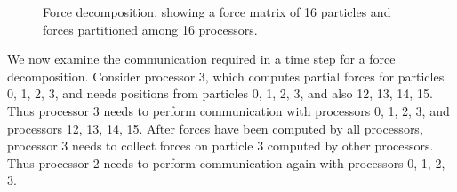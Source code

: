 \begin{figure}[htbp]
\begin{center}
\caption{Force decomposition, showing a force matrix of 16 particles and 
forces partitioned among 16 processors.}
\label{fig:force}
\end{center}
\end{figure}

We now examine the communication required in a time step
for a force decomposition.  Consider processor 3, which computes partial forces for
particles 0, 1, 2, 3, and needs positions from particles 0, 1, 2, 3, and
also 12, 13, 14, 15.  Thus processor 3 needs to perform communication with
processors 0, 1, 2, 3, and processors 12, 13, 14, 15.  After forces have
been computed by all processors, processor 3 needs to collect forces
on particle 3 computed by other processors.  Thus processor 2 needs to perform
communication again with processors 0, 1, 2, 3.

